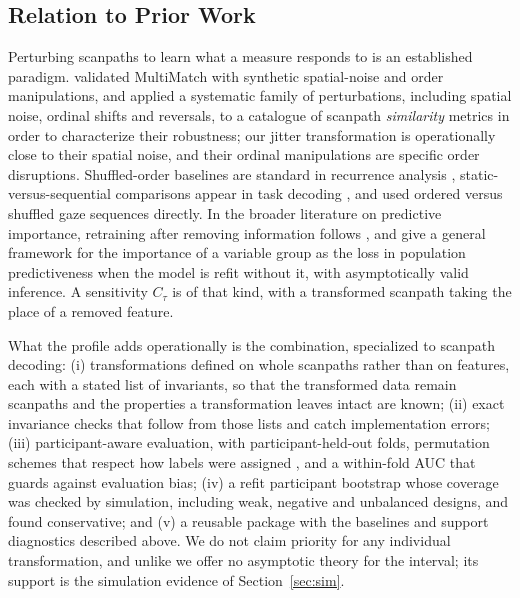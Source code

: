 \documentclass[11pt]{article}
\newcommand{\Cs}{C}
\begin{document}
\subsection{Relation to Prior Work}
Perturbing scanpaths to learn what a measure responds to is an established paradigm. \citet{dewhurst2012multimatch} validated MultiMatch with synthetic spatial-noise and order manipulations, and \citet{fahimi2021metrics} applied a systematic family of perturbations, including spatial noise, ordinal shifts and reversals, to a catalogue of scanpath \emph{similarity} metrics in order to characterize their robustness; our jitter transformation is operationally close to their spatial noise, and their ordinal manipulations are specific order disruptions. Shuffled-order baselines are standard in recurrence analysis \citep{anderson2013recurrence, anderson2015comparison}, static-versus-sequential comparisons appear in task decoding \citep{greene2012reconsidering}, and \citet{meghanathan2026temporal} used ordered versus shuffled gaze sequences directly. In the broader literature on predictive importance, retraining after removing information follows \citet{hooker2019benchmark}, and \citet{williamson2023general} give a general framework for the importance of a variable group as the loss in population predictiveness when the model is refit without it, with asymptotically valid inference. A sensitivity $\Cs_\tau$ is of that kind, with a transformed scanpath taking the place of a removed feature.

What the profile adds operationally is the combination, specialized to scanpath decoding: (i) transformations defined on whole scanpaths rather than on features, each with a stated list of invariants, so that the transformed data remain scanpaths and the properties a transformation leaves intact are known; (ii) exact invariance checks that follow from those lists and catch implementation errors; (iii) participant-aware evaluation, with participant-held-out folds, permutation schemes that respect how labels were assigned \citep{ojala2010permutation}, and a within-fold AUC that guards against evaluation bias; (iv) a refit participant bootstrap whose coverage was checked by simulation, including weak, negative and unbalanced designs, and found conservative; and (v) a reusable package with the baselines and support diagnostics described above. We do not claim priority for any individual transformation, and unlike \citet{williamson2023general} we offer no asymptotic theory for the interval; its support is the simulation evidence of Section~\ref{sec:sim}.
\end{document}
